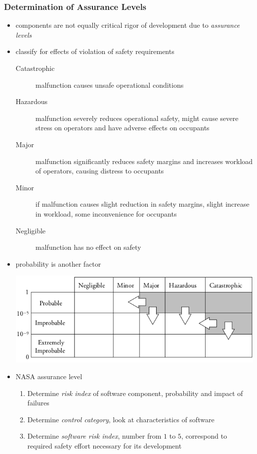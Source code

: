 \documentclass[a4paper, 10pt]{article}
\begin{document}
\subsubsection*{Determination of Assurance Levels}
\begin{itemize}
    \item components are not equally critical \follows rigor of development due to \emph{assurance levels}
    \item classify for effects of violation of safety requirements
    \begin{description}
        \item[Catastrophic] malfunction causes unsafe operational conditions
        \item[Hazardous] malfunction severely reduces operational safety, might cause severe stress on operators and have adverse effects on occupants
        \item[Major] malfunction significantly reduces safety margins and increases workload of operators, causing distress to occupants
        \item[Minor] if malfunction causes slight reduction in safety margins, slight increase in workload, some inconvenience for occupants
        \item[Negligible] malfunction has no effect on safety
    \end{description}
    \item probability is another factor
    \begin{center}
        \includegraphics[width=\linewidth]{images/riskProb.png}
    \end{center}
    \item NASA assurance level
    \begin{enumerate}
        \item Determine \emph{risk index} of software component, probability and impact of failures
        \item Determine \emph{control category}, look at characteristics of software
        \item Determine \emph{software risk index}, number from $1$ to $5$, correspond to required safety effort necessary for its development
    \end{enumerate}
\end{itemize}
\end{document}
